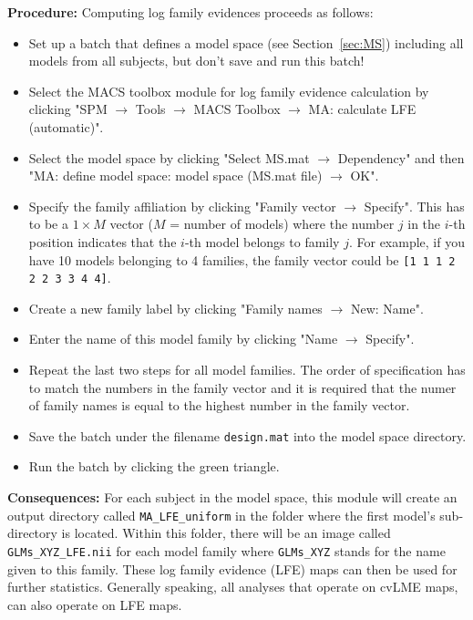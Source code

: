 \documentclass[a4paper,12pt]{article}
\newcommand{\ra}{$\rightarrow$ }
\begin{document}
\textbf{Procedure:} Computing log family evidences proceeds as follows:
\begin{itemize}

\item
Set up a batch that defines a model space (see Section~\ref{sec:MS}) including all models from all subjects, but don't save and run this batch!

\item
Select the MACS toolbox module for log family evidence calculation by clicking \linebreak[4] "SPM \ra Tools \ra MACS Toolbox \ra MA: calculate LFE (automatic)".

\item
Select the model space by clicking "Select MS.mat \ra Dependency" and then \linebreak[4] "MA: define model space: model space (MS.mat file) \ra OK".

\item
Specify the family affiliation by clicking "Family vector \ra Specify". This has to be a $1 \times M$ vector ($M$ = number of models) where the number $j$ in the $i$-th position indicates that the $i$-th model belongs to family $j$. For example, if you have 10 models belonging to 4 families, the family vector could be \texttt{[1 1 1 2 2 2 3 3 4 4]}.

\item
Create a new family label by clicking "Family names \ra New: Name".

\item
Enter the name of this model family by clicking "Name \ra Specify".

\item
Repeat the last two steps for all model families. The order of specification has to match the numbers in the family vector and it is required that the numer of family names is equal to the highest number in the family vector.

\item
Save the batch under the filename \texttt{design.mat} into the model space directory.

\item
Run the batch by clicking the green triangle.
	
\end{itemize}

\textbf{Consequences:} For each subject in the model space, this module will create an output directory called \texttt{MA\_LFE\_uniform} in the folder where the first model's sub-directory is located. Within this folder, there will be an image called \texttt{GLMs\_XYZ\_LFE.nii} for each model family where \texttt{GLMs\_XYZ} stands for the name given to this family. These log family evidence (LFE) maps can then be used for further statistics. Generally speaking, all analyses that operate on cvLME maps, can also operate on LFE maps.
\end{document}
